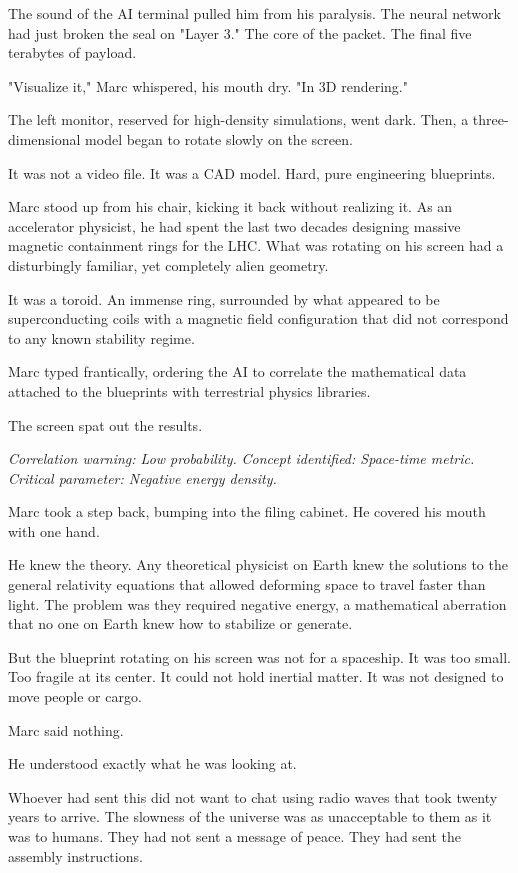 \documentclass[11pt,a5paper,twoside]{book}
\begin{document}
The sound of the AI terminal pulled him from his paralysis. The neural network had just broken the seal on "Layer 3." The core of the packet. The final five terabytes of payload.

"Visualize it," Marc whispered, his mouth dry. "In 3D rendering."

The left monitor, reserved for high-density simulations, went dark. Then, a three-dimensional model began to rotate slowly on the screen.

It was not a video file. It was a CAD model. Hard, pure engineering blueprints.

Marc stood up from his chair, kicking it back without realizing it. As an accelerator physicist, he had spent the last two decades designing massive magnetic containment rings for the LHC. What was rotating on his screen had a disturbingly familiar, yet completely alien geometry.

It was a toroid. An immense ring, surrounded by what appeared to be superconducting coils with a magnetic field configuration that did not correspond to any known stability regime.

Marc typed frantically, ordering the AI to correlate the mathematical data attached to the blueprints with terrestrial physics libraries.

The screen spat out the results.

\textit{Correlation warning: Low probability.}
\textit{Concept identified: Space-time metric.}
\textit{Critical parameter: Negative energy density.}

Marc took a step back, bumping into the filing cabinet. He covered his mouth with one hand.

He knew the theory. Any theoretical physicist on Earth knew the solutions to the general relativity equations that allowed deforming space to travel faster than light. The problem was they required negative energy, a mathematical aberration that no one on Earth knew how to stabilize or generate.

But the blueprint rotating on his screen was not for a spaceship. It was too small. Too fragile at its center. It could not hold inertial matter. It was not designed to move people or cargo.

Marc said nothing.

He understood exactly what he was looking at.

Whoever had sent this did not want to chat using radio waves that took twenty years to arrive. The slowness of the universe was as unacceptable to them as it was to humans. They had not sent a message of peace. They had sent the assembly instructions.
\end{document}
